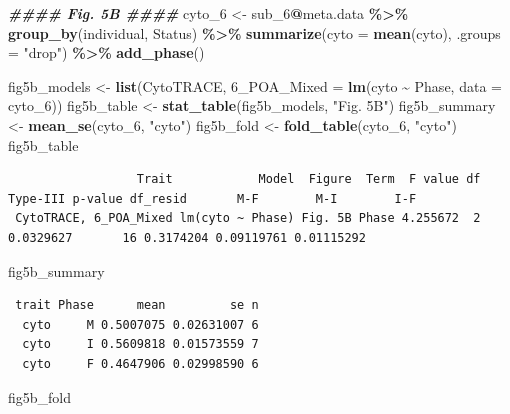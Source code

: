\documentclass[
  landscape]{article}
\newenvironment{Shaded}{\begin{snugshade}}{\end{snugshade}}
\newcommand{\AttributeTok}[1]{\textcolor[rgb]{0.13,0.29,0.53}{#1}}
\newcommand{\DocumentationTok}[1]{\textcolor[rgb]{0.56,0.35,0.01}{\textbf{\textit{#1}}}}
\newcommand{\FunctionTok}[1]{\textcolor[rgb]{0.13,0.29,0.53}{\textbf{#1}}}
\newcommand{\NormalTok}[1]{#1}
\newcommand{\OtherTok}[1]{\textcolor[rgb]{0.56,0.35,0.01}{#1}}
\newcommand{\SpecialCharTok}[1]{\textcolor[rgb]{0.81,0.36,0.00}{\textbf{#1}}}
\newcommand{\StringTok}[1]{\textcolor[rgb]{0.31,0.60,0.02}{#1}}
\begin{document}
\begin{Shaded}
\begin{Highlighting}[]
\DocumentationTok{\#\#\#\# Fig. 5B \#\#\#\#}
\NormalTok{cyto\_6 }\OtherTok{\textless{}{-}}\NormalTok{ sub\_6}\SpecialCharTok{@}\NormalTok{meta.data }\SpecialCharTok{\%\textgreater{}\%}
  \FunctionTok{group\_by}\NormalTok{(individual, Status) }\SpecialCharTok{\%\textgreater{}\%}
  \FunctionTok{summarize}\NormalTok{(}\AttributeTok{cyto =} \FunctionTok{mean}\NormalTok{(cyto), }\AttributeTok{.groups =} \StringTok{"drop"}\NormalTok{) }\SpecialCharTok{\%\textgreater{}\%}
  \FunctionTok{add\_phase}\NormalTok{()}

\NormalTok{fig5b\_models }\OtherTok{\textless{}{-}} \FunctionTok{list}\NormalTok{(}\StringTok{\textasciigrave{}}\AttributeTok{CytoTRACE, 6\_POA\_Mixed}\StringTok{\textasciigrave{}} \OtherTok{=} \FunctionTok{lm}\NormalTok{(cyto }\SpecialCharTok{\textasciitilde{}}\NormalTok{ Phase, }\AttributeTok{data =}\NormalTok{ cyto\_6))}
\NormalTok{fig5b\_table }\OtherTok{\textless{}{-}} \FunctionTok{stat\_table}\NormalTok{(fig5b\_models, }\StringTok{"Fig. 5B"}\NormalTok{)}
\NormalTok{fig5b\_summary }\OtherTok{\textless{}{-}} \FunctionTok{mean\_se}\NormalTok{(cyto\_6, }\StringTok{"cyto"}\NormalTok{)}
\NormalTok{fig5b\_fold }\OtherTok{\textless{}{-}} \FunctionTok{fold\_table}\NormalTok{(cyto\_6, }\StringTok{"cyto"}\NormalTok{)}
\NormalTok{fig5b\_table}
\end{Highlighting}
\end{Shaded}

\begin{verbatim}
                  Trait            Model  Figure  Term  F value df Type-III p-value df_resid       M-F        M-I        I-F
 CytoTRACE, 6_POA_Mixed lm(cyto ~ Phase) Fig. 5B Phase 4.255672  2        0.0329627       16 0.3174204 0.09119761 0.01115292
\end{verbatim}

\begin{Shaded}
\begin{Highlighting}[]
\NormalTok{fig5b\_summary}
\end{Highlighting}
\end{Shaded}

\begin{verbatim}
 trait Phase      mean         se n
  cyto     M 0.5007075 0.02631007 6
  cyto     I 0.5609818 0.01573559 7
  cyto     F 0.4647906 0.02998590 6
\end{verbatim}

\begin{Shaded}
\begin{Highlighting}[]
\NormalTok{fig5b\_fold}
\end{Highlighting}
\end{Shaded}
\end{document}
